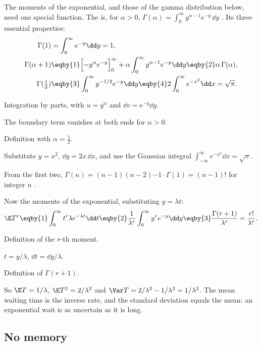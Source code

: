 The moments of the exponential, and those of the gamma distribution below, need one special function. The  is, for $\alpha>0$, $\Gamma(\alpha)=\int_0^\infty y^{\alpha-1}e^{-y}\,\dd y$ .
Its three essential properties:
\begin{align*}
  \Gamma(1) &= \int_0^\infty e^{-y}\dd y = 1,\\
  \Gamma(\alpha+1) &\eqby{1} \Bigl[-y^\alpha e^{-y}\Bigr]_0^\infty+\alpha\int_0^\infty y^{\alpha-1}e^{-y}\dd y \eqby{2} \alpha\,\Gamma(\alpha),\\
  \Gamma(\tfrac12) &\eqby{3} \int_0^\infty y^{-1/2}e^{-y}\dd y \eqby{4} 2\int_0^\infty e^{-x^2}\dd x = \sqrt\pi .
\end{align*}
\begin{explain}
  \item Integration by parts, with $u=y^\alpha$ and $\dd v=e^{-y}\dd y$.
  \item The boundary term vanishes at both ends for $\alpha>0$.
  \item Definition with $\alpha=\tfrac12$.
  \item Substitute $y=x^2$, $\dd y=2x\,\dd x$, and use the Gaussian integral $\int_{-\infty}^\infty e^{-x^2}\dd x=\sqrt\pi$.
\end{explain}
From the first two, $\Gamma(n)=(n-1)(n-2)\cdots1\cdot\Gamma(1)=(n-1)!$ for integer $n$ .

Now the moments of the exponential, substituting $y=\lambda t$:
\begin{align*}
  \E T^r \eqby{1} \int_0^\infty t^r\lambda e^{-\lambda t}\dd t \eqby{2} \frac1{\lambda^r}\int_0^\infty y^re^{-y}\dd y \eqby{3} \frac{\Gamma(r+1)}{\lambda^r}=\frac{r!}{\lambda^r}.
\end{align*}
\begin{explain}
  \item Definition of the $r$-th moment.
  \item $t=y/\lambda$, $\dd t=\dd y/\lambda$.
  \item Definition of $\Gamma(r+1)$.
\end{explain}
So $\E T=1/\lambda$, $\E T^2=2/\lambda^2$ and $\Var T=2/\lambda^2-1/\lambda^2=1/\lambda^2$. The mean waiting time is the inverse rate, and the standard deviation equals the mean: an exponential wait is as uncertain as it is long.

\subsection{No memory}

